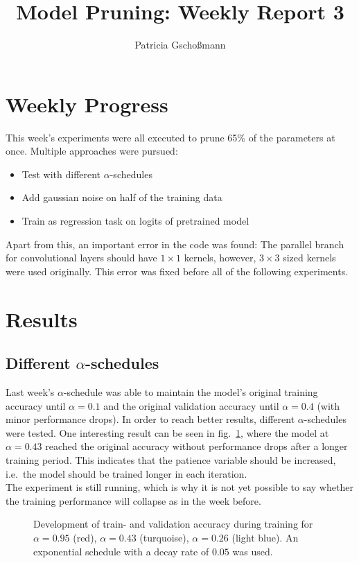 \documentclass[10pt,twocolumn,letterpaper]{article}
\begin{document}
\title{Model Pruning: Weekly Report 3}
\author{Patricia Gschoßmann}

\maketitle

\section{Weekly Progress}
This week's experiments were all executed to prune 65\% of the parameters at once.
Multiple approaches were pursued:
\begin{itemize}
	\item Test with different $\alpha$-schedules
	\item Add gaussian noise on half of the training data
	\item Train as regression task on logits of pretrained model
\end{itemize}
Apart from this, an important error in the code was found:
The parallel branch for convolutional layers should have $1\times1$ kernels, however, $3\times3$ sized kernels were used originally.
This error was fixed before all of the following experiments.

\section{Results}
\subsection{Different $\alpha$-schedules}
Last week's $\alpha$-schedule was able to maintain the model's original training accuracy until $\alpha=0.1$ and the original validation accuracy until $\alpha=0.4$ (with minor performance drops).
In order to reach better results, different $\alpha$-schedules were tested.
One interesting result can be seen in fig.~\ref{fig:acc}, where the model at $\alpha=0.43$ reached the original accuracy without performance drops after a longer training period.
This indicates that the patience variable should be increased, i.e.\ the model should be trained longer in each iteration.\\
The experiment is still running, which is why it is not yet possible to say whether the training performance will collapse as in the week before.
\begin{figure}[hpbt]
	\centering
	\hspace{0.1\textwidth}
	\caption[]{Development of train- and validation accuracy during training for $\alpha=0.95$ (red), $\alpha=0.43$ (turquoise), $\alpha=0.26$ (light blue).
	An exponential schedule with a decay rate of $0.05$ was used.}
	\label{fig:acc}
\end{figure}
\end{document}

